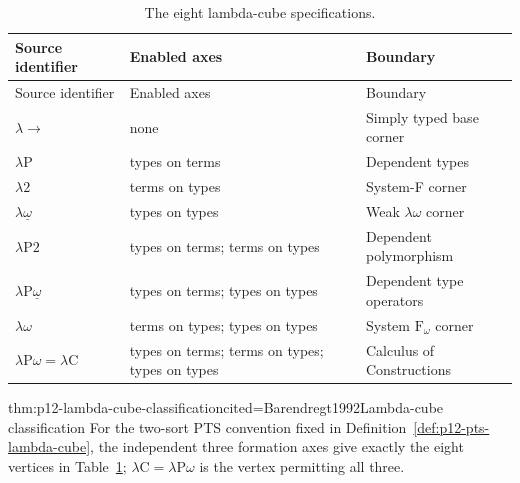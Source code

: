 \begin{longtable}{@{}p{}p{}p{}@{}}
\caption{The eight lambda-cube specifications.}
\label{tab:p12-lambda-cube}\\
\toprule
Source identifier & Enabled axes & Boundary \\ \midrule
\endfirsthead
\toprule
Source identifier & Enabled axes & Boundary \\ \midrule
\endhead
\(\lambda{\to}\) & none & Simply typed base corner \\
\(\lambda\mathrm P\) & types on terms & Dependent types \\
\(\lambda 2\) & terms on types & System-F corner \\
\(\lambda\underline{\omega}\) & types on types & Weak \(\lambda\omega\) corner \\
\(\lambda\mathrm P2\) & types on terms; terms on types & Dependent polymorphism \\
\(\lambda\mathrm P\underline{\omega}\) & types on terms; types on types &
Dependent type operators \\
\(\lambda\omega\) & terms on types; types on types & System \(\mathrm F_\omega\) corner \\
\(\lambda\mathrm P\omega=\lambda\mathrm C\) & types on terms; terms on types;
types on types & Calculus of Constructions \\
\bottomrule
\end{longtable}

\begin{hbtheorem}{thm:p12-lambda-cube-classification}{cited=Barendregt1992}{Lambda-cube classification}
For the two-sort PTS convention fixed in
Definition~\ref{def:p12-pts-lambda-cube}, the independent three formation axes
give exactly the eight vertices in Table~\ref{tab:p12-lambda-cube};
\(\lambda\mathrm C=\lambda\mathrm P\omega\) is the vertex permitting all
three.
\end{hbtheorem}

